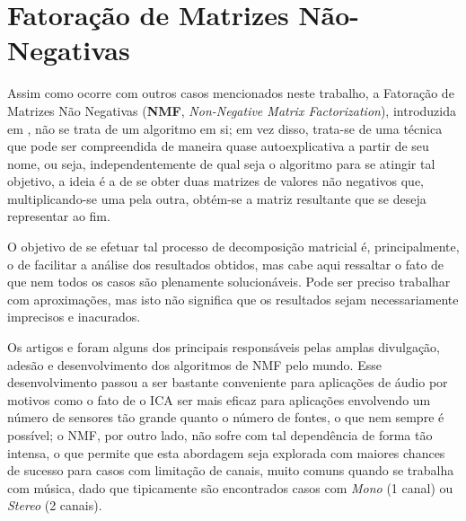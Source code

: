 





\section{Fatoração de Matrizes Não-Negativas}
\label{sec:bss_nmf}

Assim como ocorre com outros casos mencionados neste trabalho, a Fatoração de Matrizes Não Negativas (\textbf{NMF}, \textit{Non-Negative Matrix Factorization}), introduzida em \citep{1781640}, não se trata de um algoritmo em si; em vez disso, trata-se de uma técnica que pode ser compreendida de maneira quase autoexplicativa a partir de seu nome, ou seja, independentemente de qual seja o algoritmo para se atingir tal objetivo, a ideia é a de se obter duas matrizes de valores não negativos que, multiplicando-se uma pela outra, obtém-se a matriz resultante que se deseja representar ao fim.


O objetivo de se efetuar tal processo de decomposição matricial é, principalmente, o de facilitar a análise dos resultados obtidos, mas cabe aqui ressaltar o fato de que nem todos os casos são plenamente solucionáveis. Pode ser preciso trabalhar com aproximações, mas isto não significa que os resultados sejam necessariamente imprecisos e inacurados.

Os artigos \citep{lee1999learning} e \citep{Lee:2000:ANM:3008751.3008829} foram alguns dos principais responsáveis pelas amplas divulgação, adesão e desenvolvimento dos algoritmos de NMF pelo mundo. Esse desenvolvimento passou a ser bastante conveniente para aplicações de áudio por motivos como o fato de o ICA ser mais eficaz para aplicações envolvendo um número de sensores tão grande quanto o número de fontes, o que nem sempre é possível; o NMF, por outro lado, não sofre com tal dependência de forma tão intensa, o que permite que esta abordagem seja explorada com maiores chances de sucesso para casos com limitação de canais, muito comuns quando se trabalha com música, dado que tipicamente são encontrados casos com \textit{Mono} (1 canal) ou \textit{Stereo} (2 canais).
